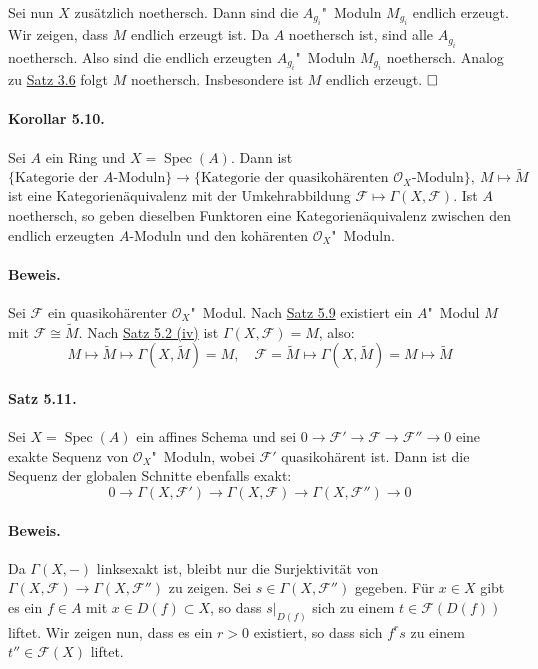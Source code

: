 \documentclass[11pt,b5paper,openany]{memoir}
\def \qed {$\hfill\square$}
\def \qedhere {\tag*{$\square$}}
\begin{document}
Sei nun $X$ zusätzlich noethersch. Dann sind die $A_{g_i}$"~Moduln $M_{g_i}$ endlich erzeugt. Wir zeigen, dass $M$ endlich erzeugt ist. Da $A$ noethersch ist, sind alle $A_{g_i}$ noethersch. Also sind die endlich erzeugten $A_{g_i}$"~Moduln $M_{g_i}$ noethersch. Analog zu \hyperref[3.6]{Satz 3.6} folgt $M$ noethersch. Insbesondere ist $M$ endlich erzeugt. \qed

\paragraph{Korollar 5.10.}\label{5.10} Sei $A$ ein Ring und $X=\operatorname{Spec}(A)$. Dann ist
\[\{\text{Kategorie der $A$-Moduln}\}\to\{\text{Kategorie der quasikohärenten $\mathcal{O}_X$-Moduln}\},\ M\mapsto\widetilde{M} \]
ist eine Kategorienäquivalenz mit der Umkehrabbildung $\mathcal{F}\mapsto\Gamma(X,\mathcal{F})$. Ist $A$ noethersch, so geben dieselben Funktoren eine Kategorienäquivalenz zwischen den endlich erzeugten $A$-Moduln und den kohärenten $\mathcal{O}_X$"~Moduln.

\paragraph{Beweis.} Sei $\mathcal{F}$ ein quasikohärenter $\mathcal{O}_X$"~Modul. Nach \hyperref[5.9]{Satz 5.9} existiert ein $A$"~Modul $M$ mit $\mathcal{F}\cong\widetilde{M}$. Nach \hyperref[5.2]{Satz 5.2 (iv)} ist $\Gamma(X,\mathcal{F})=M$, also:
\[M\mapsto\widetilde{M}\mapsto \Gamma(X,\widetilde{M})=M,\quad\mathcal{F}=\widetilde{M}\mapsto \Gamma(X,\widetilde{M})=M\mapsto\widetilde{M}\qedhere \]

\paragraph{Satz 5.11.}\label{5.11} Sei $X=\operatorname{Spec}(A)$ ein affines Schema und sei $0\to\mathcal{F}'\to\mathcal{F}\to\mathcal{F}''\to 0$ eine exakte Sequenz von $\mathcal{O}_X$"~Moduln, wobei $\mathcal{F}'$ quasikohärent ist. Dann ist die Sequenz der globalen Schnitte ebenfalls exakt:
\[0\to\Gamma(X,\mathcal{F}')\to\Gamma(X,\mathcal{F})\to\Gamma(X,\mathcal{F}'')\to 0 \]

\paragraph{Beweis.} Da $\Gamma(X,-)$ linksexakt ist, bleibt nur die Surjektivität von $\Gamma(X,\mathcal{F})\to\Gamma(X,\mathcal{F}'')$ zu zeigen. Sei $s\in\Gamma(X,\mathcal{F}'')$ gegeben. Für $x\in X$ gibt es ein $f\in A$ mit $x\in D(f) \subset X$, so dass $s|_{D(f)}$ sich zu einem $t\in\mathcal{F}(D(f))$ liftet. Wir zeigen nun, dass es ein $r>0$ existiert, so dass sich $f^rs$ zu einem $t''\in\mathcal{F}(X)$ liftet.
\end{document}
